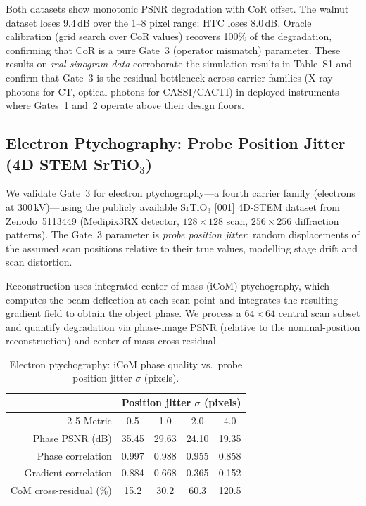 \documentclass[11pt]{article}
\begin{document}
\noindent Both datasets show monotonic PSNR degradation with CoR offset.
The walnut dataset loses $9.4$\,dB over the 1--8 pixel range; HTC loses $8.0$\,dB.
Oracle calibration (grid search over CoR values) recovers 100\% of the degradation, confirming that CoR is a pure Gate~3 (operator mismatch) parameter.
These results on \emph{real sinogram data} corroborate the simulation results in Table~S1 and confirm that Gate~3 is the residual bottleneck across carrier families (X-ray photons for CT, optical photons for CASSI/CACTI) in deployed instruments where Gates~1 and~2 operate above their design floors.

\subsection{Electron Ptychography: Probe Position Jitter (4D STEM SrTiO\texorpdfstring{$_3$}{3})}
\label{sec:ptycho_real}

We validate Gate~3 for electron ptychography---a fourth carrier family (electrons at 300\,kV)---using the publicly available SrTiO$_3$ [001] 4D-STEM dataset from Zenodo~5113449 (Medipix3RX detector, $128\times128$ scan, $256\times256$ diffraction patterns).
The Gate~3 parameter is \emph{probe position jitter}: random displacements of the assumed scan positions relative to their true values, modelling stage drift and scan distortion.

Reconstruction uses integrated center-of-mass (iCoM) ptychography, which computes the beam deflection at each scan point and integrates the resulting gradient field to obtain the object phase.
We process a $64\times64$ central scan subset and quantify degradation via phase-image PSNR (relative to the nominal-position reconstruction) and center-of-mass cross-residual.

\begin{table}[!ht]
\centering\small
\caption{Electron ptychography: iCoM phase quality vs.\ probe position jitter $\sigma$ (pixels).}
\label{tab:ptycho_jitter}
\begin{tabular}{@{}rcccc@{}}
\toprule
& \multicolumn{4}{c}{Position jitter $\sigma$ (pixels)} \\
\cmidrule(l){2-5}
Metric & 0.5 & 1.0 & 2.0 & 4.0 \\
\midrule
Phase PSNR (dB)          & 35.45 & 29.63 & 24.10 & 19.35 \\
Phase correlation         & 0.997 & 0.988 & 0.955 & 0.858 \\
Gradient correlation      & 0.884 & 0.668 & 0.365 & 0.152 \\
CoM cross-residual (\%)  & 15.2  & 30.2  & 60.3  & 120.5 \\
\bottomrule
\end{tabular}
\end{table}
\end{document}

